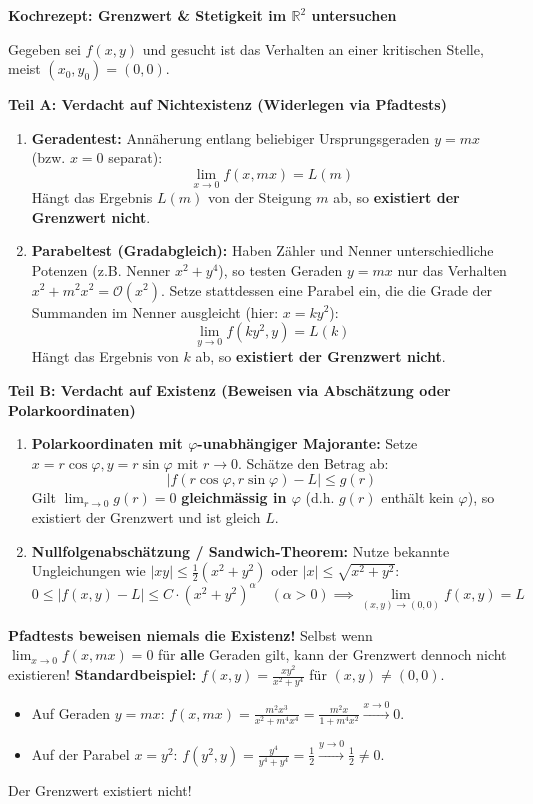 \begin{example}
    \textbf{Kochrezept: Grenzwert \& Stetigkeit im $\mathbb{R}^2$ untersuchen}
    
    Gegeben sei $f(x, y)$ und gesucht ist das Verhalten an einer kritischen Stelle, meist $(x_0, y_0) = (0, 0)$.

    \textbf{Teil A: Verdacht auf Nichtexistenz (Widerlegen via Pfadtests)}
    \begin{enumerate}
        \item \textbf{Geradentest:} Annäherung entlang beliebiger Ursprungsgeraden $y = mx$ (bzw. $x = 0$ separat):
        $$ \lim_{x \to 0} f(x, mx) = L(m) $$
        Hängt das Ergebnis $L(m)$ von der Steigung $m$ ab, so \textbf{existiert der Grenzwert nicht}.
        \item \textbf{Parabeltest (Gradabgleich):}
        Haben Zähler und Nenner unterschiedliche Potenzen (z.B. Nenner $x^2 + y^4$), so testen Geraden $y = mx$ nur das Verhalten $x^2 + m^2 x^2 = \mathcal{O}(x^2)$. Setze stattdessen eine Parabel ein, die die Grade der Summanden im Nenner ausgleicht (hier: $x = k y^2$):
        $$ \lim_{y \to 0} f(k y^2, y) = L(k) $$
        Hängt das Ergebnis von $k$ ab, so \textbf{existiert der Grenzwert nicht}.
    \end{enumerate}

    \textbf{Teil B: Verdacht auf Existenz (Beweisen via Abschätzung oder Polarkoordinaten)}
    \begin{enumerate}
        \item \textbf{Polarkoordinaten mit $\varphi$-unabhängiger Majorante:}
        Setze $x = r \cos\varphi, y = r \sin\varphi$ mit $r \to 0$. Schätze den Betrag ab:
        $$ |f(r\cos\varphi, r\sin\varphi) - L| \le g(r) $$
        Gilt $\lim_{r \to 0} g(r) = 0$ \textbf{gleichmässig in $\varphi$} (d.h. $g(r)$ enthält kein $\varphi$), so existiert der Grenzwert und ist gleich $L$.
        \item \textbf{Nullfolgenabschätzung / Sandwich-Theorem:}
        Nutze bekannte Ungleichungen wie $|xy| \le \frac{1}{2}(x^2 + y^2)$ oder $|x| \le \sqrt{x^2 + y^2}$:
        $$ 0 \le |f(x, y) - L| \le C \cdot (x^2 + y^2)^\alpha \quad (\alpha > 0) \implies \lim_{(x,y)\to(0,0)} f(x, y) = L $$
    \end{enumerate}
\end{example}

\begin{example}
    \textbf{Pfadtests beweisen niemals die Existenz!}
    Selbst wenn $\lim_{x \to 0} f(x, mx) = 0$ für \textbf{alle} Geraden gilt, kann der Grenzwert dennoch nicht existieren!
    \textbf{Standardbeispiel:} $f(x, y) = \frac{x y^2}{x^2 + y^4}$ für $(x, y) \neq (0, 0)$.
    \begin{itemize}
        \item Auf Geraden $y = mx$: $f(x, mx) = \frac{m^2 x^3}{x^2 + m^4 x^4} = \frac{m^2 x}{1 + m^4 x^2} \xrightarrow{x \to 0} 0$.
        \item Auf der Parabel $x = y^2$: $f(y^2, y) = \frac{y^4}{y^4 + y^4} = \frac{1}{2} \xrightarrow{y \to 0} \frac{1}{2} \neq 0$.
    \end{itemize}
    Der Grenzwert existiert nicht!
\end{example}

